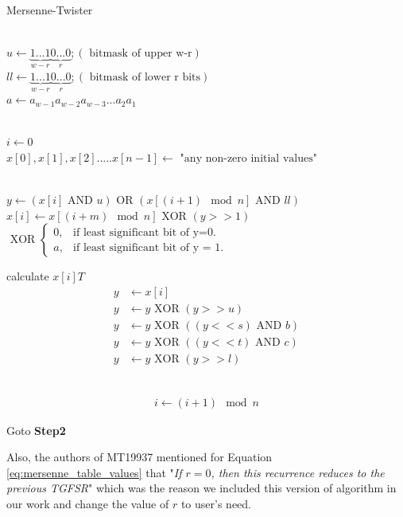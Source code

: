 \documentclass[12pt,journal,compsoc]{IEEEtran}
\begin{document}
\begin{algorithm}                      
\caption{Mersenne-Twister}
\label{alg_mersenne_twister}
\begin{algorithmic}
    
     \\
    $u \leftarrow \underbrace{1...1}_{w-r}\underbrace{0...0}_{r}; (\text{ bitmask of upper w-r})$ \\ 
    $ll \leftarrow \underbrace{1...1}_{w-r}\underbrace{0...0}_{r}; (\text{ bitmask of lower r bits})$ \\
    $a \leftarrow a_{w-1}a_{w-2}a_{w-3}...a_{2}a_{1}$
    
    \\
    $i \leftarrow 0$ \\
    $x[0], x[1], x[2].....x[n-1]\leftarrow \text{ "any non-zero initial values"}$
    
    \\
    $y \leftarrow (x[i] \text{ AND }u) \text{ OR } (x[(i+1) \mod n] \text{ AND }ll)$ \\
    
    $x[i] \leftarrow x[(i+m) \mod n] \text{ XOR } (y>>1)$ \\
    	$
		\text{ XOR } \begin{cases}
					0, & \text{if least significant bit of y=0}.\\
    					a, & \text{if least significant bit of y = 1}.
				\end{cases}
    	$
    
     calculate $x[i]T$ \\ 
    \begin{align*}
    	y &\leftarrow x[i]\\
	y &\leftarrow y \text{ XOR } (y>>u) \\
	y &\leftarrow y \text{ XOR } ((y<<s) \text{ AND } b) \\
	y &\leftarrow y \text{ XOR } ((y << t) \text{ AND } c) \\
	y &\leftarrow y \text{ XOR } (y >> l)
\end{align*}
    
     \\
    \begin{align*}
    	i \leftarrow (i+1) \mod n
    \end{align*}
    
    Goto {\bf Step2}
\end{algorithmic}
\end{algorithm}
Also, the authors of MT19937\cite{MT19937} mentioned for Equation \ref{eq:mersenne_table_values} that "\emph{If $r=0$, then this recurrence reduces to the previous TGFSR}" which was the reason we included this version of algorithm in our work and change the value of $r$ to user's need.
\end{document}
